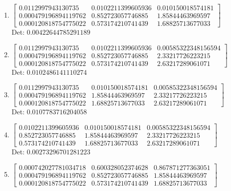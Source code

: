 \documentclass[12pt]{article}
\begin{document}
\begin{enumerate}
\item $\displaystyle \left[\begin{matrix}0.0112997943130735 & 0.0102211399605936 & 0.010150018574181\\0.000479196894119762 & 0.852723057746885 & 1.85844463969597\\0.000120818754775022 & 0.573174210741439 & 1.68825713677033\end{matrix}\right]$\\

Det: $0.00422644785291189$\\

\item $\displaystyle \left[\begin{matrix}0.0112997943130735 & 0.0102211399605936 & 0.00585322348156594\\0.000479196894119762 & 0.852723057746885 & 2.33217726223215\\0.000120818754775022 & 0.573174210741439 & 2.63217289061071\end{matrix}\right]$\\

Det: $0.0102486141110274$\\

\item $\displaystyle \left[\begin{matrix}0.0112997943130735 & 0.010150018574181 & 0.00585322348156594\\0.000479196894119762 & 1.85844463969597 & 2.33217726223215\\0.000120818754775022 & 1.68825713677033 & 2.63217289061071\end{matrix}\right]$\\

Det: $0.0107783716204058$\\

\item $\displaystyle \left[\begin{matrix}0.0102211399605936 & 0.010150018574181 & 0.00585322348156594\\0.852723057746885 & 1.85844463969597 & 2.33217726223215\\0.573174210741439 & 1.68825713677033 & 2.63217289061071\end{matrix}\right]$\\

Det: $0.00273296701281223$\\

\item $\displaystyle \left[\begin{matrix}0.000742027781034718 & 0.600328052374628 & 0.867871277363051\\0.000479196894119762 & 0.852723057746885 & 1.85844463969597\\0.000120818754775022 & 0.573174210741439 & 1.68825713677033\end{matrix}\right]$\\


\end{enumerate}
\end{document}
